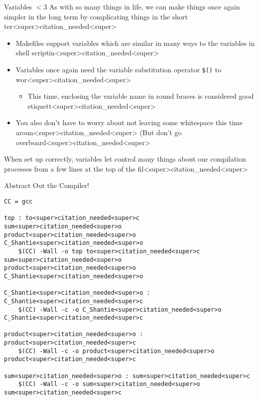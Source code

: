 \documentclass[11pt]{beamer}
\begin{document}
\begin{frame}{Variables $<$3}
As with so many things in life, we can make things once again simpler in the long term by complicating things in the short ter<super>citation_needed<super>  
\begin{itemize}
\item Makefiles support variables which are similar in many ways to the variables in shell scriptin<super>citation_needed<super>  
\item Variables once again need the variable substitution operator \texttt{\$()} to wor<super>citation_needed<super>
\begin{itemize}
\item This time, enclosing the variable name in round braces is considered good etiquett<super>citation_needed<super>  
\end{itemize}
\item You also don't have to worry about not leaving some whitespace this time aroun<super>citation_needed<super>  (But don't go overboard<super>citation_needed<super>
\end{itemize}
When set up correctly, variables let control many things about our compilation processes from a few lines at the top of the fil<super>citation_needed<super>  
\end{frame}

\begin{frame}[fragile=singleslide]{Abstract Out the Compiler!}
\begin{lstlisting}[style=terminal]
CC = gcc

top : to<super>citation_needed<super>c sum<super>citation_needed<super>o product<super>citation_needed<super>o C_Shantie<super>citation_needed<super>o 
	$(CC) -Wall -o top to<super>citation_needed<super>c sum<super>citation_needed<super>o product<super>citation_needed<super>o C_Shantie<super>citation_needed<super>o

C_Shantie<super>citation_needed<super>o : C_Shantie<super>citation_needed<super>c
	$(CC) -Wall -c -o C_Shantie<super>citation_needed<super>o C_Shantie<super>citation_needed<super>c

product<super>citation_needed<super>o : product<super>citation_needed<super>c
	$(CC) -Wall -c -o product<super>citation_needed<super>o product<super>citation_needed<super>c

sum<super>citation_needed<super>o : sum<super>citation_needed<super>c
	$(CC) -Wall -c -o sum<super>citation_needed<super>o sum<super>citation_needed<super>c
\end{lstlisting}
\end{frame}
\end{document}

